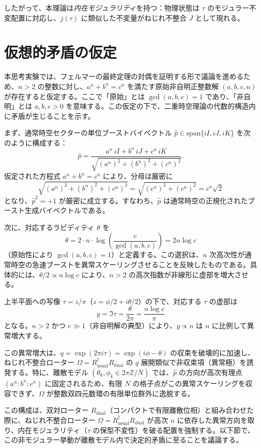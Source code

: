 \documentclass[dvipdfmx,a4paper]{article}
\begin{document}
したがって、本理論は\emph{内在モジュラリティ}を持つ：物理状態は $\tau$ のモジュラー不変配置に対応し、$j(\tau)$ に類似した不変量がねじれ不整合 $J$ として現れる。

\section{仮想的矛盾の仮定}

本思考実験では、フェルマーの最終定理の対偶を証明する形で議論を進めるため、$n > 2$ の整数に対し、$a^n + b^n = c^n$ を満たす原始非自明正整数解 $(a, b, c, n)$ が存在すると仮定する。ここで「原始」とは $\gcd(a, b, c) = 1$ であり、「非自明」とは $a, b, c > 0$ を意味する。この仮定の下で、二重時空理論の代数的構造内に矛盾が生じることを示す。

まず、通常時空セクターの単位ブーストバイベクトル $\hat{p} \in \mathrm{span}\{iI, iJ, iK\}$ を次のように構成する：
\[
\hat{p} = \frac{a^n \, iI + b^n \, iJ + c^n \, iK}{\sqrt{(a^n)^2 + (b^n)^2 + (c^n)^2}}.
\]
仮定された方程式 $a^n + b^n = c^n$ により、分母は厳密に
\[
\sqrt{(a^n)^2 + (b^n)^2 + (c^n)^2} = \sqrt{(c^n)^2 + (c^n)^2} = c^n \sqrt{2}
\]
となり、$\hat{p}^2 = +1$ が厳密に成立する。すなわち、$\hat{p}$ は通常時空の正規化されたブースト生成バイベクトルである。

次に、対応するラピディティ $\theta$ を
\[
\theta = 2 \cdot n \cdot \log\!\left( \frac{c}{\gcd(a,b,c)} \right) = 2 n \log c
\]
（原始性により $\gcd(a,b,c)=1$）と定義する。この選択は、$n$ 次高次性が通常時空の急速ブーストを異常スケーリングさせることを反映したものである。具体的には、$\theta / 2 \propto n \log c$ により、$n > 2$ の高次指数が非線形に虚部を増大させる。

上半平面への写像 $\tau = z / \pi$（$z = \phi/2 + i \theta/2$）の下で、対応する $\tau$ の虚部は
\[
y = \Im \tau = \frac{\theta}{2\pi} = \frac{n \log c}{\pi}
\]
となる。$n > 2$ かつ $c \gg 1$（非自明解の典型）により、$y \propto n$ は $n$ に比例して異常増大する。

この異常増大は、$q = \exp(2\pi i \tau) = \exp(i \phi - \theta)$ の収束を破壊的に加速し、ねじれ不整合ローター $\Omega = R_\text{usual}^\dagger R_\text{dual}$ の $q$ 展開類似で非収束項（異常極）を誘発する。特に、離散モデル $(\theta_k, \phi_k \in 2\pi \mathbb{Z}/N)$ では、$\hat{p}$ の方向が高次有理点 $(a^n : b^n : c^n)$ に固定されるため、有限 $N$ の格子点がこの異常スケーリングを収容できず、$\Omega$ が整数双四元数環の有限単位群外に逸脱する。

この構成は、双対ローター $R_\text{dual}$（コンパクトで有限離散位相）と組み合わせた際に、ねじれ不整合ローター $\Omega = R_\text{usual}^\dagger R_\text{dual}$ が高次 $n$ に依存した異常方向を取り、内在モジュラリティ（$\tau$ の保型不変性）を破る配置を強制する。以下節で、この非モジュラー挙動が離散モデル内で決定的矛盾に至ることを議論する。
\end{document}
